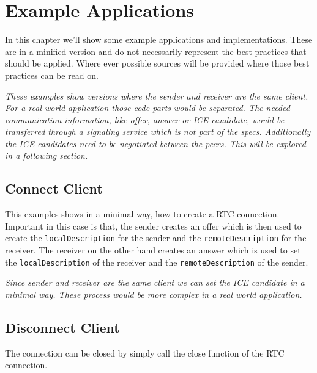 \section{Example Applications}
In this chapter we'll show some example applications and implementations. These are in a minified version and do not necessarily represent the best practices that should be applied. Where ever possible sources will be provided where those best practices can be read on.

\textit{These examples show versions where the sender and receiver are the same client. For a real world application those code parts would be separated. The needed communication information, like offer, answer or ICE candidate, would be transferred through a signaling service which is not part of the  specs. Additionally the ICE candidates need to be negotiated between the peers. This will be explored in a following section.}

\subsection{Connect Client}
This examples shows in a minimal way, how to create a RTC connection. Important in this case is that, the sender creates an offer which is then used to create the \lstinline[basicstyle=\ttfamily\color{black}]|localDescription| for the sender and the \lstinline[basicstyle=\ttfamily\color{black}]|remoteDescription| for the receiver. The receiver on the other hand creates an answer which is used to set the \lstinline[basicstyle=\ttfamily\color{black}]|localDescription| of the receiver and the \lstinline[basicstyle=\ttfamily\color{black}]|remoteDescription| of the sender.

\textit{Since sender and receiver are the same client we can set the ICE candidate in a minimal way. These process would be more complex in a real world application.}


\subsection{Disconnect Client}
The connection can be closed by simply call the close function of the RTC connection.


